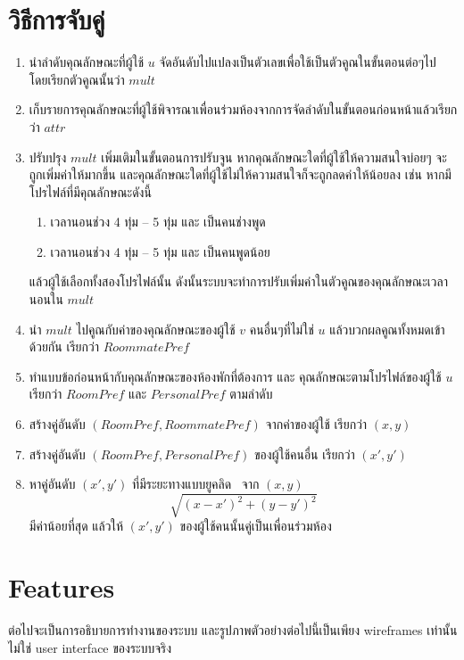 \section{วิธีการจับคู่}
\begin{enumerate}
  \item นำลำดับคุณลักษณะที่ผู้ใช้ $u$ จัดอันดับไปแปลงเป็นตัวเลขเพื่อใช้เป็นตัวคูณในขั้นตอนต่อๆไป โดยเรียกตัวคูณนั้นว่า $\mathit{mult}$
  \item เก็บรายการคุณลักษณะที่ผู้ใช้พิจารณาเพื่อนร่วมห้องจากการจัดลำดับในขั้นตอนก่อนหน้าแล้วเรียกว่า $\mathit{attr}$
  \item ปรับปรุง $\mathit{mult}$ เพิ่มเติมในขั้นตอนการปรับจูน หากคุณลักษณะใดที่ผู้ใช้ให้ความสนใจบ่อยๆ จะถูกเพิ่มค่าให้มากขึ้น และคุณลักษณะใดที่ผู้ใช้ไม่ให้ความสนใจก็จะถูกลดค่าให้น้อยลง 
        เช่น หากมีโปรไฟล์ที่มีคุณลักษณะดังนี้
        \begin{enumerate}
          \item เวลานอนช่วง 4 ทุ่ม -- 5 ทุ่ม และ เป็นคนช่างพูด  
          \item เวลานอนช่วง 4 ทุ่ม -- 5 ทุ่ม และ เป็นคนพูดน้อย  
        \end{enumerate} 
        แล้วผู้ใช้เลือกทั้งสองโปรไฟล์นั้น ดังนั้นระบบจะทำการปรับเพิ่มค่าในตัวคูณของคุณลักษณะเวลานอนใน $\mathit{mult}$
  \item นำ $\mathit{mult}$ ไปคูณกับค่าของคุณลักษณะของผู้ใช้ $v$ คนอื่นๆที่ไม่ใช่ $u$ แล้วบวกผลคูณทั้งหมดเข้าด้วยกัน เรียกว่า $\mathit{RoommatePref}$
  \item ทำแบบข้อก่อนหน้ากับคุณลักษณะของห้องพักที่ต้องการ และ คุณลักษณะตามโปรไฟล์ของผู้ใช้ $u$ เรียกว่า $\mathit{RoomPref}$ และ $\mathit{PersonalPref}$ ตามลำดับ
  \item สร้างคู่อันดับ $(\mathit{RoomPref}, \mathit{RoommatePref})$ จากค่าของผู้ใช้ เรียกว่า $(x,y)$ 
  \item สร้างคู่อันดับ $(\mathit{RoomPref}, \mathit{PersonalPref})$ ของผู้ใช้คนอื่น เรียกว่า $(x',y')$
  \item หาคู่อันดับ $(x',y')$ ที่มีระยะทางแบบยูคลิด~\cite{euclid-dist} จาก $(x,y)$
  \[\sqrt{(x-x')^2 + (y-y')^2}\] มีค่าน้อยที่สุด 
  แล้วให้ $(x',y')$ ของผู้ใช้คนนั้นคู่เป็นเพื่อนร่วมห้อง
\end{enumerate}

\section{Features}
ต่อไปจะเป็นการอธิบายการทำงานของระบบ และรูปภาพตัวอย่างต่อไปนี้เป็นเพียง wireframes เท่านั้น ไม่ใช่ user interface ของระบบจริง

